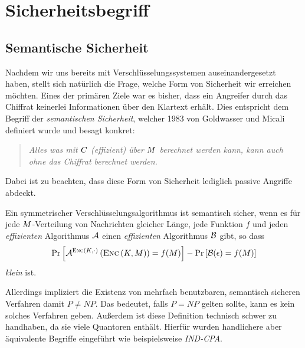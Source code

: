 \chapter{Sicherheitsbegriff}
\section{Semantische Sicherheit}\label{ch:sicherheitsbegriffe:semantischesicherheit}
Nachdem wir uns bereits mit Verschlüsselungssystemen auseinandergesetzt haben, stellt sich natürlich die Frage, welche Form von Sicherheit wir erreichen möchten. 
Eines der primären Ziele war es bisher, dass ein Angreifer durch das Chiffrat keinerlei Informationen über den Klartext erhält. Dies entspricht dem Begriff der \emph{semantischen Sicherheit},
welcher 1983 von Goldwasser und Micali \cite{Goldwasser1984} definiert wurde und besagt konkret:
\begin{quote}
	\emph{Alles was mit $C$ (effizient) über $M$ berechnet werden kann, kann auch ohne das Chiffrat berechnet werden.}
\end{quote}
Dabei ist zu beachten, dass diese Form von Sicherheit lediglich passive Angriffe abdeckt.

\begin{definition}\label{def:semsec}
Ein symmetrischer Verschlüsselungsalgorithmus ist semantisch sicher, wenn es für jede $M$-Verteilung von Nachrichten gleicher Länge, jede Funktion $f$
und jeden \emph{effizienten} Algorithmus $\mathcal{A}$ einen \emph{effizienten} Algorithmus $\mathcal{B}$ gibt, so dass
\begin{align*}
	\text{Pr}\left[ \mathcal{A}^{\textsc{Enc} (K,\cdot)} \left( \textsc{Enc} \left( K, M \right) \right) = f(M) \right] - \text{Pr} \left[ \mathcal{B} (\epsilon) = f (M) \right]
\end{align*}
\emph{klein} ist.
\end{definition}

Allerdings impliziert die Existenz von mehrfach benutzbaren, semantisch sicheren Verfahren damit $P \neq NP$. Das bedeutet, falls $P = NP$ gelten sollte, kann
es kein solches Verfahren geben. Außerdem ist diese Definition technisch schwer zu handhaben, da sie viele Quantoren enthält. Hierfür wurden handlichere
aber äquivalente Begriffe eingeführt wie beispielsweise \emph{IND-CPA}.

